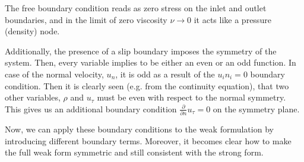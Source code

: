 The free boundary condition reads as zero stress on the inlet and outlet boundaries, and in the limit of zero viscosity $\nu \rightarrow 0$ it acts like a pressure (density) node.

Additionally, the presence of a slip boundary imposes the symmetry of the system. Then, every variable implies to be either an even or an odd function. In case of the normal velocity, $u_n$, it is odd as a result of the $u_i n_i = 0$ boundary condition. Then it is clearly seen (e.g. from the continuity equation), that two other variables, $\rho$ and $u_{\tau}$ must be even with respect to the normal symmetry. This gives us an additional boundary condition $\frac{\partial}{\partial n}u_{\tau}= 0$ on the symmetry plane.




Now, we can apply these boundary conditions to the weak formulation by introducing different boundary terms. Moreover, it becomes clear how to make the full weak form symmetric and still consistent with the strong form.

